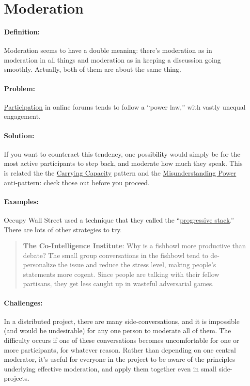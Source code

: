 \section{Moderation}
\paragraph{Definition:} Moderation seems to have a double meaning: there's
moderation as in moderation in all things and moderation as in keeping a
discussion going smoothly. Actually, both of them are about the same
thing.

\paragraph{Problem:}
\href{http://peeragogy.org/organizing-a-learning-context/participation/}{Participation}
in online forums tends to follow a ``power law,'' with vastly unequal
engagement.

\paragraph{Solution:} If you want to counteract this tendency, one
possibility would simply be for the most active participants to step
back, and moderate how much they speak. This is related the the
\href{http://peeragogy.org/patterns-usecases/patterns-and-heuristics/carrying-capacity/}{Carrying
Capacity} pattern and the
\href{http://peeragogy.org/practice/antipatterns/misunderstanding-power/}{Misunderstanding
Power} anti-pattern: check those out before you proceed.

\paragraph{Examples:} Occupy Wall Street used a technique that they called
the ``\href{http://en.wikipedia.org/wiki/Progressive_stack}{progressive
stack}.'' There are lots of other strategies to try.

\begin{quote}
\textbf{The Co-Intelligence Institute}: Why is a fishbowl more
productive than debate? The small group conversations in the fishbowl
tend to de-personalize the issue and reduce the stress level, making
people's statements more cogent. Since people are talking with their
fellow partisans, they get less caught up in wasteful adversarial games.
\end{quote}

\paragraph{Challenges:} In a distributed project, there are many
side-conversations, and it is impossible (and would be undesirable) for
any one person to moderate all of them. The difficulty occurs if one of
these conversations becomes uncomfortable for one or more participants,
for whatever reason. Rather than depending on one central moderator,
it's useful for everyone in the project to be aware of the principles
underlying effective moderation, and apply them together even in small
side-projects.

